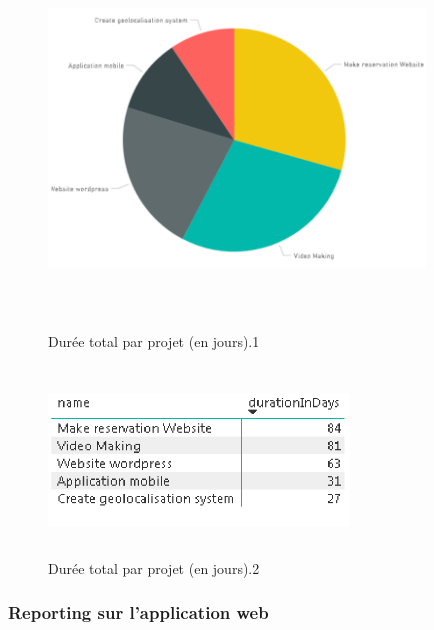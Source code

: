 \begin{itemize}
\begin{figure}[H]
\center
\includegraphics[width=10cm,height=10cm]{./figures/rpb4.png}
\caption{Dur\'{e}e total par projet (en jours).1}

\end{figure}

\begin{figure}[H]
\center
\includegraphics[width=8cm,height=5cm]{./figures/rpb42.png}
\caption{Dur\'{e}e total par projet (en jours).2}

\end{figure}



\end{itemize}



\subsubsection{Reporting sur l'application web}

